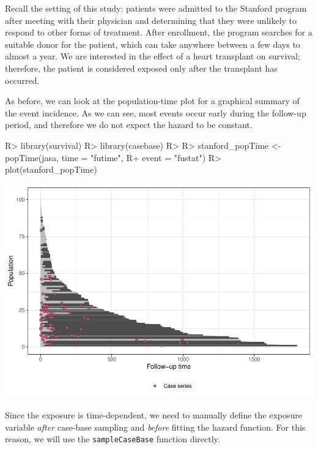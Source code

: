 \documentclass[
]{jss}
\begin{document}
Recall the setting of this study: patients were admitted to the Stanford
program after meeting with their physician and determining that they
were unlikely to respond to other forms of treatment. After enrollment,
the program searches for a suitable donor for the patient, which can
take anywhere between a few days to almost a year. We are interested in
the effect of a heart transplant on survival; therefore, the patient is
considered exposed only after the transplant has occurred.

As before, we can look at the population-time plot for a graphical
summary of the event incidence. As we can see, most events occur early
during the follow-up period, and therefore we do not expect the hazard
to be constant.

\begin{CodeChunk}

\begin{CodeInput}
R> library(survival)
R> library(casebase)
R> 
R> stanford_popTime <- popTime(jasa, time = "futime", 
R+                             event = "fustat")
R> plot(stanford_popTime)
\end{CodeInput}


\begin{center}\includegraphics{../figures/stanford-poptime-1} \end{center}

\end{CodeChunk}

Since the exposure is time-dependent, we need to manually define the
exposure variable \emph{after} case-base sampling and \emph{before}
fitting the hazard function. For this reason, we will use the
\texttt{sampleCaseBase} function directly.
\end{document}
